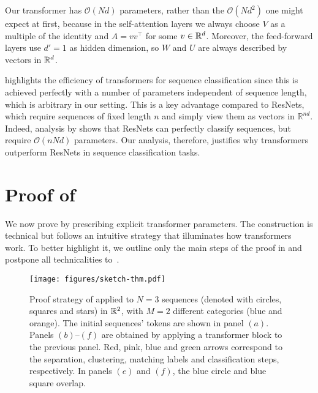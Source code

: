 \documentclass[11pt,a4paper]{amsart}
\begin{document}
\begin{remark}
    Our transformer has $\mathcal{O}(Nd)$ parameters, rather than the $\mathcal{O}(Nd^2)$ one might expect at first, because in the self-attention layers we always choose $V$ as a multiple of the identity and $A = vv^\top$ for some $v\in \mathbb{R}^d$. Moreover, the feed-forward layers use $d'= 1$ as hidden dimension, so $W$ and $U$ are always described by vectors in $\mathbb{R}^d$.
\end{remark}
 highlights the efficiency of transformers for sequence classification since this is achieved perfectly with a number of parameters independent of sequence length, which is arbitrary in our setting. This is a key advantage compared to ResNets, which require sequences of fixed length $n$ and simply view them as vectors in $\mathbb{R}^{nd}$. Indeed, analysis by \citet{domenec2023NODES} shows that ResNets can perfectly classify sequences, but require $\mathcal{O}(nNd)$ parameters. 
Our analysis, therefore, justifies why transformers outperform ResNets in sequence classification tasks.
%
\section{Proof of }
We now prove  by prescribing explicit transformer parameters. The construction is technical but follows an intuitive strategy that illuminates how transformers work. To better highlight it, we outline only the main steps of the proof in  and postpone all technicalities to~.
\begin{figure}
    \centering
    \texttt{[image: figures/sketch-thm.pdf]}
    \caption{Proof strategy of  applied to $N=3$ sequences (denoted with circles, squares and stars) in $\mathbb{R}^2$, with $M=2$ different categories (blue and orange). The initial sequences' tokens are shown in panel $(a)$. Panels $(b)$--$(f)$ are obtained by applying a transformer block to the previous panel. Red, pink, blue and green arrows correspond to the separation, clustering, matching labels and classification steps, respectively. In panels $(e)$ and $(f)$, the blue circle and blue square overlap.}
    \label{fig:thm_sketch}
\end{figure}

%
\end{document}
